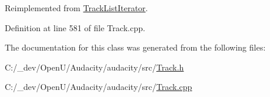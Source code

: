 Reimplemented from \hyperlink{class_track_list_iterator_a4eea44fac9add00ff978213df1652441}{Track\+List\+Iterator}.



Definition at line 581 of file Track.\+cpp.



The documentation for this class was generated from the following files\+:\begin{DoxyCompactItemize}
\item 
C\+:/\+\_\+dev/\+Open\+U/\+Audacity/audacity/src/\hyperlink{src_2track_8h}{Track.\+h}\item 
C\+:/\+\_\+dev/\+Open\+U/\+Audacity/audacity/src/\hyperlink{src_2track_8cpp}{Track.\+cpp}\end{DoxyCompactItemize}
